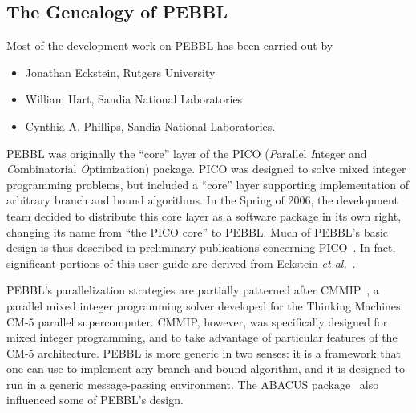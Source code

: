 \subsection{The Genealogy of PEBBL}

Most of the development work on PEBBL has been carried out by
\begin{itemize}
\item Jonathan Eckstein, Rutgers University
\item William Hart, Sandia National Laboratories
\item Cynthia A. Phillips, Sandia National Laboratories.
\end{itemize}
PEBBL was originally the ``core''
layer of the PICO (\emph{P}arallel \emph{I}nteger and
\emph{C}ombina\-torial \emph{O}ptimization) package.  PICO was designed
to solve mixed integer programming problems, but included a ``core''
layer supporting implementation of arbitrary branch and bound
algorithms.  In the Spring of 2006, the development team decided to
distribute this core layer as a software package in its own right,
changing its name from ``the PICO core'' to PEBBL.  Much of PEBBL's
basic design is thus described in preliminary
publications concerning PICO~\cite{EHP97,EPH00,EPH00a}.  In fact,
significant portions of this user guide are derived
from Eckstein \emph{et al.}~\cite{EPH00a,EPH00}.

PEBBL's parallelization strategies are partially patterned after
CMMIP~\cite{Eck94,Eck97}, a parallel mixed integer programming solver
developed for the Thinking Machines CM-5 parallel supercomputer.
CMMIP, however, was specifically designed for mixed integer
programming, and to take advantage of particular features of the CM-5
architecture.  PEBBL is more generic in two senses: it is a framework that
one can use to implement any branch-and-bound algorithm, and it is
designed to run in a generic message-passing environment.  The ABACUS
package~\cite{JT98} also influenced some of PEBBL's design.
